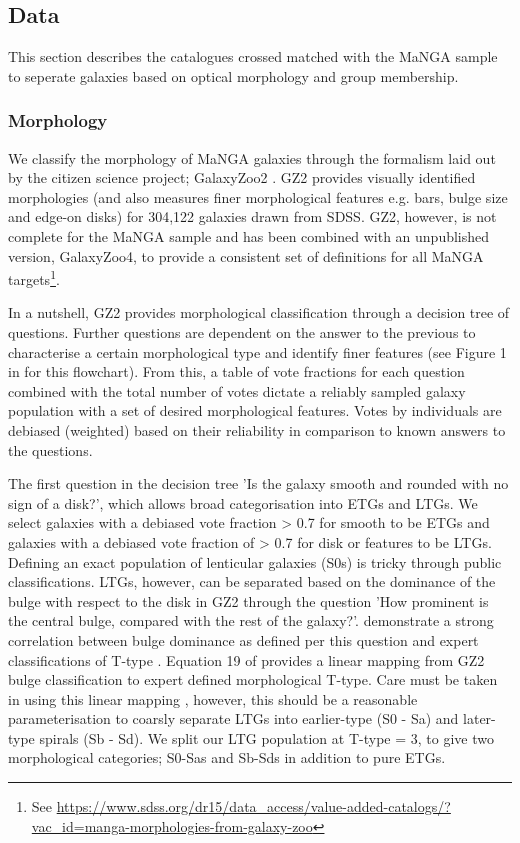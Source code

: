 \subsection{Data} \label{sec:data_obs}
This section describes the catalogues crossed matched with the MaNGA sample to seperate galaxies based on optical morphology and group membership.

\subsubsection{Morphology} \label{sec:morph_def_obs}
We classify the morphology of MaNGA galaxies through the formalism laid out by the citizen science project; GalaxyZoo2 \citep[GZ2,][]{willett2013}. GZ2 provides visually identified morphologies (and also measures finer morphological features e.g. bars, bulge size and edge-on disks) for 304,122 galaxies drawn from SDSS. GZ2, however, is not complete for the MaNGA sample and has been combined with an unpublished version, GalaxyZoo4, to provide a consistent set of definitions for all MaNGA targets\footnote{See \url{https://www.sdss.org/dr15/data_access/value-added-catalogs/?vac_id=manga-morphologies-from-galaxy-zoo}}. 

In a nutshell, GZ2 provides morphological classification through a decision tree of questions. Further questions are dependent on the answer to the previous to characterise a certain morphological type and identify finer features (see Figure 1 in \citet{willett2013} for this flowchart). From this, a table of vote fractions for each question combined with the total number of votes dictate a reliably sampled galaxy population with a set of desired morphological features. Votes by individuals are debiased (weighted) based on their reliability in comparison to known answers to the questions.

The first question in the decision tree 'Is the galaxy smooth and rounded with no sign of a disk?', which allows broad categorisation into ETGs and LTGs. We select galaxies with a debiased vote fraction > 0.7 for smooth to be ETGs and galaxies with a debiased vote fraction of > 0.7 for disk or features to be LTGs. Defining an exact population of lenticular galaxies (S0s) is tricky through public classifications. LTGs, however, can be separated based on the dominance of the bulge with respect to the disk in GZ2 through the question 'How prominent is the central bulge, compared with the rest of the galaxy?'. \citet{willett2013} demonstrate a strong correlation between bulge dominance as defined per this question and expert classifications of T-type \citep{nair2010}. Equation 19 of \citet{willett2013} provides a linear mapping from GZ2 bulge classification to expert defined morphological T-type. Care must be taken in using this linear mapping \citep[see discussion in][]{willett2013}, however, this should be a reasonable parameterisation to coarsly separate LTGs into earlier-type (S0 - Sa) and later-type spirals (Sb - Sd). We split our LTG population at T-type = 3, to give two morphological categories; S0-Sas and Sb-Sds in addition to pure ETGs.

